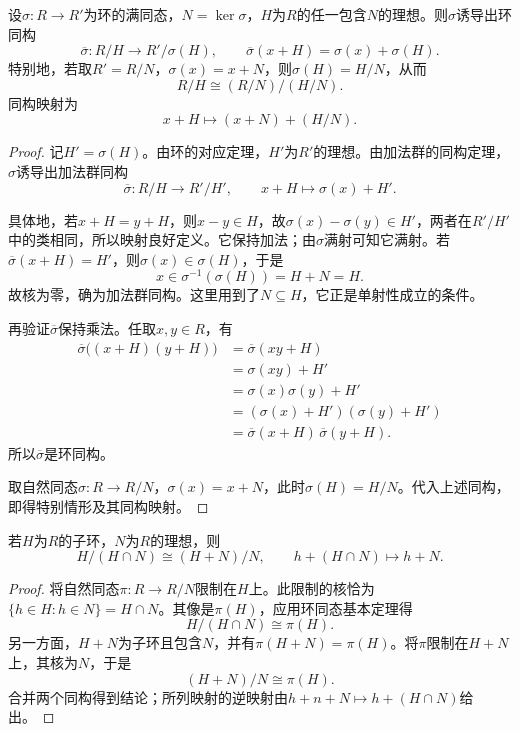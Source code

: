 \begin{theorem}\label{p2:ring-third-iso}
设$\sigma:R\to R'$为环的满同态，$N=\ker\sigma$，$H$为$R$的任一包含$N$的理想。则$\sigma$诱导出环同构
\[
\overline\sigma:R/H\longrightarrow R'/\sigma(H),
\qquad
\overline\sigma(x+H)=\sigma(x)+\sigma(H).
\]
特别地，若取$R'=R/N$，$\sigma(x)=x+N$，则$\sigma(H)=H/N$，从而
\[
R/H\cong(R/N)/(H/N).
\]
同构映射为
\[
x+H\longmapsto(x+N)+(H/N).
\]
\end{theorem}
\begin{proof}
记$H'=\sigma(H)$。由环的对应定理，$H'$为$R'$的理想。由加法群的同构定理，$\sigma$诱导出加法群同构
\[
\overline\sigma:R/H\longrightarrow R'/H',
\qquad x+H\longmapsto\sigma(x)+H'.
\]

具体地，若$x+H=y+H$，则$x-y\in H$，故$\sigma(x)-\sigma(y)\in H'$，两者在$R'/H'$中的类相同，所以映射良好定义。它保持加法；由$\sigma$满射可知它满射。若$\overline\sigma(x+H)=H'$，则$\sigma(x)\in\sigma(H)$，于是
\[
x\in\sigma^{-1}(\sigma(H))=H+N=H.
\]
故核为零，确为加法群同构。这里用到了$N\subseteq H$，它正是单射性成立的条件。

再验证$\overline\sigma$保持乘法。任取$x,y\in R$，有
\begin{align*}
\overline\sigma\bigl((x+H)(y+H)\bigr)
&=\overline\sigma(xy+H)\\
&=\sigma(xy)+H'\\
&=\sigma(x)\sigma(y)+H'\\
&=(\sigma(x)+H')(\sigma(y)+H')\\
&=\overline\sigma(x+H)\,\overline\sigma(y+H).
\end{align*}
所以$\overline\sigma$是环同构。

取自然同态$\sigma:R\to R/N$，$\sigma(x)=x+N$，此时$\sigma(H)=H/N$。代入上述同构，即得特别情形及其同构映射。
\end{proof}

\begin{theorem}\label{p2:ring-second-iso}
若$H$为$R$的子环，$N$为$R$的理想，则
\[
H/(H\cap N)\cong(H+N)/N,\qquad
h+(H\cap N)\longmapsto h+N.
\]
\end{theorem}
\begin{proof}
将自然同态$\pi:R\to R/N$限制在$H$上。此限制的核恰为$\{h\in H:h\in N\}=H\cap N$。其像是$\pi(H)$，应用环同态基本定理得
\[
H/(H\cap N)\cong\pi(H).
\]
另一方面，$H+N$为子环且包含$N$，并有$\pi(H+N)=\pi(H)$。将$\pi$限制在$H+N$上，其核为$N$，于是
\[
(H+N)/N\cong\pi(H).
\]
合并两个同构得到结论；所列映射的逆映射由$h+n+N\mapsto h+(H\cap N)$给出。
\end{proof}


